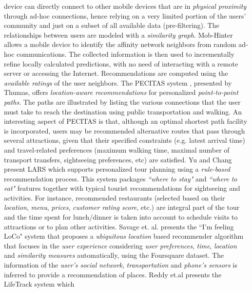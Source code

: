 device can directly connect to other mobile devices that are in 
\textit{physical proximity} through ad-hoc connections, hence 
relying on a very limited portion of the users' community and just 
on a subset of all available data (pre-filtering). The relationships 
between users are modeled with a \textit{similarity graph}. Mob-Hinter 
allows a mobile device to identify the affinity network neighbors 
from random ad-hoc communications. The collected information 
is then used to incrementally refine locally
calculated predictions, with no need of interacting with a remote
server or accessing the Internet. Recommendations are computed
using the \textit{available ratings} of the user neighbors.
The PECITAS system \cite{tumas2009personalized}, presented by Thumas, 
offers \textit{location-aware recommendations} for personalized 
\textit{point-to-point paths}. The paths are illustrated by listing 
the various connections that the user must take to reach the 
destination using public transportation and walking. An
interesting aspect of PECITAS is that, although an optimal shortest 
path facility is incorporated, users may be recommended alternative 
routes that pass through several attractions, given that
their specified constraints (e.g. latest arrival time) and travel-related 
preferences (maximum walking time, maximal number of transport
transfers, sightseeing preferences, etc) are satisfied. 
Yu and Chang present LARS  \cite{yu2009personalized} 
which supports personalized tour planning using a \textit{rule-based} 
recommendation process. This system
packages \textit{``where to stay"} and \textit{``where to eat"} 
features together with typical tourist recommendations 
for sightseeing and activities. For
instance, recommended restaurants (selected based on their 
\textit{location}, \textit{menu},  \textit{prices}, \textit{customer rating score}, 
etc.) are integral part of the tour and the time spent for 
lunch/dinner is taken into account to schedule visits to 
attractions or to plan other activities.
Savage et. al. presents the ``I'm feeling LoCo" system \cite{savage2012m}
that proposes a \textit{ubiquitous location­} based recommender algorithm
that focuses in the \textit{user experience} considering 
\textit{user preferences}, \textit{time}, \textit{location} and 
\textit{similarity measures} automatically, using the Foursquare
dataset. The information of the \textit{user's social network},
\textit{transportation} and \textit{phone's sensors} is inferred to provide
a recommendation of places.
Reddy et.al \cite{reddy2006lifetrak} presents the LifeTrack system which 
